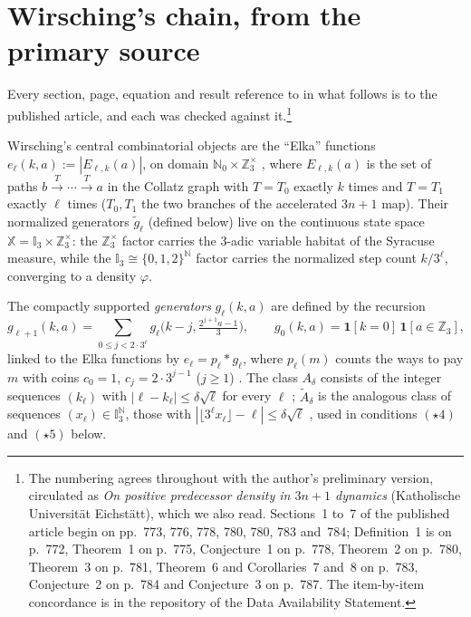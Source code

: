 \documentclass[11pt]{article}
\theoremstyle{definition}
\theoremstyle{remark}
\begin{document}
\section{Wirsching's chain, from the primary source}
\label{sec:chain}

Every section, page, equation and result reference to
\cite{Wirsching2003} in what follows is to the published article, and
each was checked against it.\footnote{The numbering agrees throughout with the author's
preliminary version, circulated as \emph{On positive predecessor density
in $3n+1$ dynamics} (Katholische Universit\"at Eichst\"att), which we
also read. Sections~1 to~7 of the published article begin on pp.~773,
776, 778, 780, 780, 783 and~784; Definition~1 is on p.~772, Theorem~1 on
p.~775, Conjecture~1 on p.~778, Theorem~2 on p.~780, Theorem~3 on
p.~781, Theorem~6 and Corollaries~7 and~8 on p.~783, Conjecture~2 on
p.~784 and Conjecture~3 on p.~787. The item-by-item concordance is in the repository of the Data
Availability Statement.}

Wirsching's central combinatorial objects are the ``Elka'' functions
$e_\ell(k,a):=|E_{\ell,k}(a)|$, on domain
$\mathbb N_0\times\mathbb Z_3^\times$ \cite[\S1--2]{Wirsching2003},
where $E_{\ell,k}(a)$ is the set of
paths $b\xrightarrow{T}\cdots\xrightarrow{T}a$ in the Collatz graph
with $T=T_0$ exactly $k$ times and $T=T_1$ exactly $\ell$ times
($T_0,T_1$ the two branches of the
accelerated $3n+1$ map). Their normalized generators $\widetilde
g_\ell$ (defined below) live on the continuous state space
$\mathbb X=\mathbb I_3\times\mathbb Z_3^\times$: the
$\mathbb Z_3^\times$ factor carries the $3$-adic variable habitat of
the Syracuse measure, while the $\mathbb I_3\cong\{0,1,2\}^{\mathbb
N}$ factor carries the normalized step count $k/3^\ell$, converging to
a density $\varphi$.

The compactly supported \emph{generators} $g_\ell(k,a)$ are defined by
the recursion \cite[\S2, eq.~(2.1)]{Wirsching2003}
\begin{equation}\label{eq:g-recursion}
 g_{\ell+1}(k,a)=\sum_{0\le j<2\cdot3^\ell}
 g_\ell\bigl(k-j,\tfrac{2^{j+1}a-1}{3}\bigr),
 \qquad g_0(k,a)=\mathbf 1[k=0]\,\mathbf1[a\in\mathbb Z_3],
\end{equation}
linked to the Elka functions by $e_\ell=p_\ell*g_\ell$, where
$p_\ell(m)$ counts the ways to pay $m$ with coins $c_0=1$,
$c_j=2\cdot3^{j-1}$ ($j\ge1$) \cite[\S2]{Wirsching2003}. The class
$A_\delta$ consists of the integer sequences $(k_\ell)$ with
$|\ell-k_\ell|\le\delta\sqrt\ell$ for every $\ell$
\cite[eq.~(1.5)]{Wirsching2003}; $\widetilde A_\delta$ is the
analogous class of sequences $(x_\ell)\in\mathbb I_3^{\mathbb N}$, those
with $|\lfloor3^\ell x_\ell\rfloor-\ell|\le\delta\sqrt\ell$
\cite[eq.~(3.2)]{Wirsching2003}, used in conditions $(\star4)$ and
$(\star5)$ below.
\end{document}
